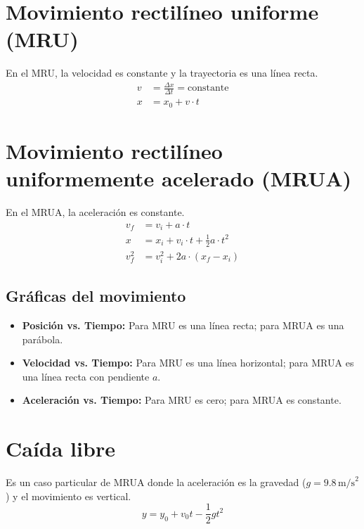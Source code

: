 \section{Movimiento rectilíneo uniforme (MRU)}

En el MRU, la velocidad es constante y la trayectoria es una línea recta.
\begin{align}
    v &= \frac{\Delta x}{\Delta t} = \text{constante} \\
    x &= x_0 + v \cdot t
\end{align}

\section{Movimiento rectilíneo uniformemente acelerado (MRUA)}

En el MRUA, la aceleración es constante.
\begin{align}
    v_f &= v_i + a \cdot t \\
    x &= x_i + v_i \cdot t + \frac{1}{2} a \cdot t^2 \\
    v_f^2 &= v_i^2 + 2a \cdot (x_f - x_i)
\end{align}

\subsection{Gráficas del movimiento}
\begin{itemize}
    \item \textbf{Posición vs. Tiempo:} Para MRU es una línea recta; para MRUA es una parábola.
    \item \textbf{Velocidad vs. Tiempo:} Para MRU es una línea horizontal; para MRUA es una línea recta con pendiente \(a\).
    \item \textbf{Aceleración vs. Tiempo:} Para MRU es cero; para MRUA es constante.
\end{itemize}

\section{Caída libre}

Es un caso particular de MRUA donde la aceleración es la gravedad (\(g = 9.8 \, \text{m/s}^2\)) y el movimiento es vertical.
\begin{equation}
    y = y_0 + v_0 t - \frac{1}{2} g t^2
\end{equation}

